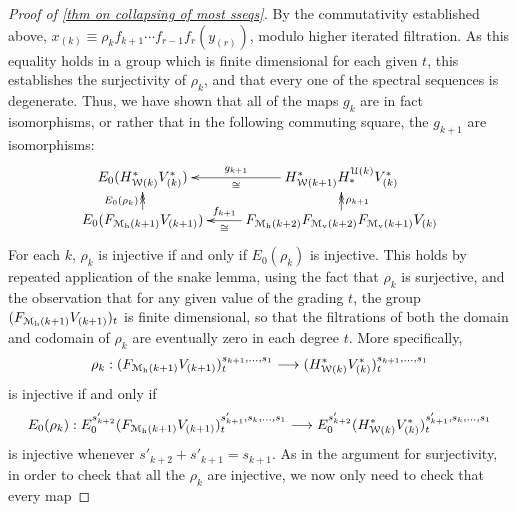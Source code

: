 \documentclass[11pt]{amsart}
\theoremstyle{plain}
\theoremstyle{definition}
\renewcommand{\to}{\longrightarrow}
\newcommand{\calW}{\mathcal{W}}
\newcommand{\calU}{\mathcal{U}}
\newcommand{\calM}{\mathcal{M}}
\theoremstyle{plain}
\newcommand{\UEAX}{\overline{X}'}%
\begin{document}
\begin{Calculations of HWn for n nonzero}
\begin{proof}[Proof of \ref{thm on collapsing of most sseqs}]
By the commutativity established above, $x_{(k)}\equiv\rho_{k}f_{k+1}\cdots f_{r-1}f_r(y_{(r)})$, modulo higher iterated filtration. As this equality holds in a group which is finite dimensional for each given $t$, this establishes the surjectivity of $\rho_k$, and that
%
%
%
every one of the spectral sequences is degenerate. Thus, we have shown that all of the maps $g_k$ are in fact isomorphisms, or rather that in the following commuting square, the $g_{k+1}$ are isomorphisms:
\[\xymatrix@R=4mm{
E_{0}(H_{\calW(k)}^{*}V^{*}_{(k)})
&H_{\calW(k+1)}^{*}H_*^{\calU(k)}V_{(k)}^*\ar@{->}[l]^-{\cong}_-{{g}_{k+1}}
\\
E_0(F_{\calM_{\textup{h}}(k+1)}V_{(k+1)})\ar@{->>}[u]^-{E_0(\rho_k)}
&F_{\calM_{\textup{h}}(k+2)}F_{\calM_{\textup{v}}(k+2)}F_{\calM_\textup{v}(k+1)}V_{(k)}\ar@{->}[l]^-{\cong}_-{{f}_{k+1}}\ar@{->>}[u]_-{\rho_{k+1}}
}\]
For each $k$, $\rho_k$ is injective if and only if $E_0(\rho_k)$ is injective. This holds by repeated application of the snake lemma, using the fact that $\rho_k$ is surjective, and the observation that for any given value of the grading $t$, the group $(F_{\calM_{\textup{h}}(k+1)}V_{(k+1)})_t$ is finite dimensional, so that the filtrations of both the domain and codomain of $\rho_k$ are eventually zero in each degree $t$. More specifically,
\[\rho_k:(F_{\calM_{\textup{h}}(k+1)}V_{(k+1)})_t^{s_{k+1},\ldots,s_1}\to (H_{\calW(k)}^{*}V^{*}_{(k)})_t^{s_{k+1},\ldots,s_1}\]
is injective if and only if
\[E_0(\rho_k):E_0^{s'_{k+2}}(F_{\calM_{\textup{h}}(k+1)}V_{(k+1)})_t^{s'_{k+1},s_k,\ldots,s_1}\to E_0^{s'_{k+2}}(H_{\calW(k)}^{*}V^{*}_{(k)})_t^{s'_{k+1},s_k,\ldots,s_1}\]
is injective whenever $s'_{k+2}+s'_{k+1}=s_{k+1}$. As in the argument for surjectivity, in order to check that all the $\rho_k$ are injective, we now only need to check that every map

\end{proof}
\end{Calculations of HWn for n nonzero}
\end{document}
